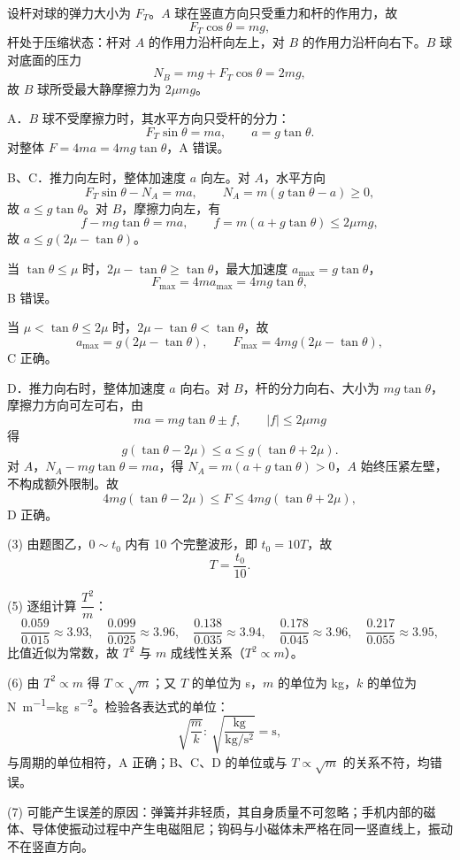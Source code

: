 \begin{answer}
设杆对球的弹力大小为 $F_{T}$。$A$ 球在竖直方向只受重力和杆的作用力，故
\[
  F_{T}\cos\theta=mg,
\]
杆处于压缩状态：杆对 $A$ 的作用力沿杆向左上，对 $B$ 的作用力沿杆向右下。$B$ 球对底面的压力
\[
  N_{B}=mg+F_{T}\cos\theta=2mg,
\]
故 $B$ 球所受最大静摩擦力为 $2\mu mg$。

A．$B$ 球不受摩擦力时，其水平方向只受杆的分力：
\[
  F_{T}\sin\theta=ma,\qquad a=g\tan\theta.
\]
对整体 $F=4ma=4mg\tan\theta$，A 错误。

B、C．推力向左时，整体加速度 $a$ 向左。对 $A$，水平方向
\[
  F_{T}\sin\theta-N_{A}=ma,\qquad N_{A}=m\left(g\tan\theta-a\right)\ge0,
\]
故 $a\le g\tan\theta$。对 $B$，摩擦力向左，有
\[
  f-mg\tan\theta=ma,\qquad f=m\left(a+g\tan\theta\right)\le2\mu mg,
\]
故 $a\le g\left(2\mu-\tan\theta\right)$。

当 $\tan\theta\le\mu$ 时，$2\mu-\tan\theta\ge\tan\theta$，最大加速度 $a_{\max}=g\tan\theta$，
\[
  F_{\max}=4ma_{\max}=4mg\tan\theta,
\]
B 错误。

当 $\mu<\tan\theta\le2\mu$ 时，$2\mu-\tan\theta<\tan\theta$，故
\[
  a_{\max}=g\left(2\mu-\tan\theta\right),\qquad
  F_{\max}=4mg\left(2\mu-\tan\theta\right),
\]
C 正确。

D．推力向右时，整体加速度 $a$ 向右。对 $B$，杆的分力向右、大小为 $mg\tan\theta$，摩擦力方向可左可右，由
\[
  ma=mg\tan\theta\pm f,\qquad |f|\le2\mu mg
\]
得
\[
  g\left(\tan\theta-2\mu\right)\le a\le g\left(\tan\theta+2\mu\right).
\]
对 $A$，$N_{A}-mg\tan\theta=ma$，得 $N_{A}=m\left(a+g\tan\theta\right)>0$，$A$ 始终压紧左壁，不构成额外限制。故
\[
  4mg\left(\tan\theta-2\mu\right)\le F\le4mg\left(\tan\theta+2\mu\right),
\]
D 正确。
\end{answer}

\begin{answer}
(3) 由题图乙，$0\sim t_{0}$ 内有 10 个完整波形，即 $t_{0}=10T$，故
\[
  T=\frac{t_{0}}{10}.
\]

(5) 逐组计算 $\dfrac{T^{2}}{m}$：
\[
  \frac{0.059}{0.015}\approx3.93,\quad
  \frac{0.099}{0.025}\approx3.96,\quad
  \frac{0.138}{0.035}\approx3.94,\quad
  \frac{0.178}{0.045}\approx3.96,\quad
  \frac{0.217}{0.055}\approx3.95,
\]
比值近似为常数，故 $T^{2}$ 与 $m$ 成线性关系（$T^{2}\propto m$）。

(6) 由 $T^{2}\propto m$ 得 $T\propto\sqrt{m}$；又 $T$ 的单位为 \si{\second}，$m$ 的单位为 \si{\kilogram}，$k$ 的单位为 \si{\newton\per\metre}=\si{\kilogram\per\second\squared}。检验各表达式的单位：
\[
  \sqrt{\frac{m}{k}}:\ \sqrt{\frac{\si{\kilogram}}{\si{\kilogram\per\second\squared}}}
  =\si{\second},
\]
与周期的单位相符，A 正确；B、C、D 的单位或与 $T\propto\sqrt{m}$ 的关系不符，均错误。

(7) 可能产生误差的原因：弹簧并非轻质，其自身质量不可忽略；手机内部的磁体、导体使振动过程中产生电磁阻尼；钩码与小磁体未严格在同一竖直线上，振动不在竖直方向。
\end{answer}

